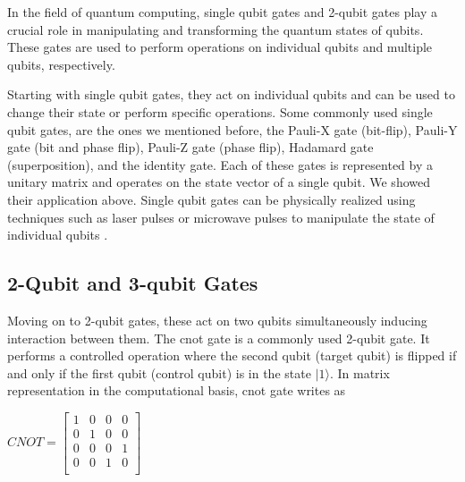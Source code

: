 \documentclass[inscr,ack,preface]{diphdthesis}
\begin{document}
In the field of quantum computing, single \acrshort{qubit} gates and 2-\acrshort{qubit} gates play a crucial role in manipulating and transforming the quantum states of \acrshort{qubit}s. These gates are used to perform operations on individual \acrshort{qubit}s and multiple \acrshort{qubit}s, respectively.

Starting with single \acrshort{qubit} gates, they act on individual \acrshort{qubit}s and can be used to change their state or perform specific operations. Some commonly used single \acrshort{qubit} gates, are the ones we mentioned before, the Pauli-X gate (bit-flip), Pauli-Y gate (bit and phase flip), Pauli-Z gate (phase flip), Hadamard gate (superposition), and the identity gate. Each of these gates is represented by a unitary matrix and operates on the state vector of a single \acrshort{qubit}. We showed their application above. Single \acrshort{qubit} gates can be physically realized using techniques such as laser pulses or microwave pulses to manipulate the state of individual \acrshort{qubit}s \cite{microwave}.

\subsection{2-Qubit and 3-qubit Gates}
Moving on to 2-\acrshort{qubit} gates, these act on two \acrshort{qubit}s simultaneously inducing interaction between them. The \acrfull{cnot} gate is a commonly used 2-\acrshort{qubit} gate. It performs a controlled operation where the second \acrshort{qubit} (target \acrshort{qubit}) is flipped if and only if the first \acrshort{qubit} (control \acrshort{qubit}) is in the state $|1\rangle$. In matrix representation in the computational basis, \acrfull{cnot} gate writes as
    \begin{center}
    \Large
    $CNOT = 
        \begin{bmatrix}
            1 & 0 & 0 & 0 \\
            0 & 1 & 0 & 0 \\
            0 & 0 & 0 & 1 \\
            0 & 0 & 1 & 0 \\
        \end{bmatrix}$
    \end{center}
\normalsize
\end{document}
